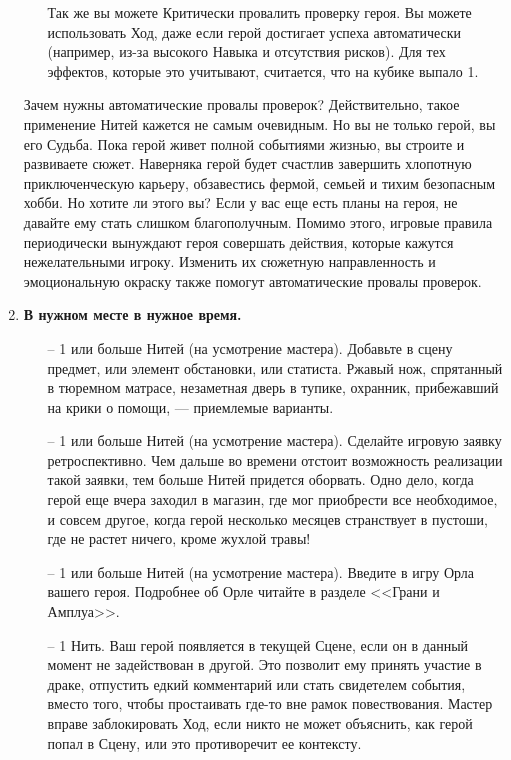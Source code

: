 \begin{enumerate}
\begin{itemize}
\newline Так же вы можете Критически провалить проверку героя. Вы можете использовать Ход, даже если герой достигает успеха автоматически (например, из-за высокого Навыка и отсутствия рисков). Для тех эффектов, которые это учитывают, считается, что на кубике выпало 1.
\end{itemize}
\begin{tcolorbox}
Зачем нужны автоматические провалы проверок? Действительно, такое применение Нитей кажется не самым очевидным. Но вы не только герой, вы его Судьба. Пока герой живет полной событиями жизнью, вы строите и развиваете сюжет. Наверняка герой будет счастлив завершить хлопотную приключенческую карьеру, обзавестись фермой, семьей и тихим безопасным хобби. Но хотите ли этого вы? Если у вас еще есть планы на героя, не давайте ему стать слишком благополучным.
\newline Помимо этого, игровые правила периодически вынуждают героя совершать действия, которые кажутся нежелательными игроку. Изменить их сюжетную направленность и эмоциональную окраску также помогут автоматические провалы проверок.
\end{tcolorbox}
\item \textbf{В нужном месте в нужное время.}
\begin{itemize}
\item[--] 1 или больше Нитей (на усмотрение мастера). Добавьте в сцену предмет, или элемент обстановки, или статиста. Ржавый нож, спрятанный в тюремном матрасе, незаметная дверь в тупике, охранник, прибежавший на крики о помощи, — приемлемые варианты.
\item[--] 1 или больше Нитей (на усмотрение мастера). Сделайте игровую заявку ретроспективно. Чем дальше во времени отстоит возможность реализации такой заявки, тем больше Нитей придется оборвать. Одно дело, когда герой еще вчера заходил в магазин, где мог приобрести все необходимое, и совсем другое, когда герой несколько месяцев странствует в пустоши, где не растет ничего, кроме жухлой травы!
\item[--] 1 или больше Нитей (на усмотрение мастера). Введите в игру Орла вашего героя. Подробнее об Орле читайте в разделе <<Грани и Амплуа>>.
\item[--] 1 Нить. Ваш герой появляется в текущей Сцене, если он в данный момент не задействован в другой. Это позволит ему принять участие в драке, отпустить едкий комментарий или стать свидетелем события, вместо того, чтобы простаивать где-то вне рамок повествования. Мастер вправе заблокировать Ход, если никто не может объяснить, как герой попал в Сцену, или это противоречит ее контексту.

\end{itemize}
\end{enumerate}
